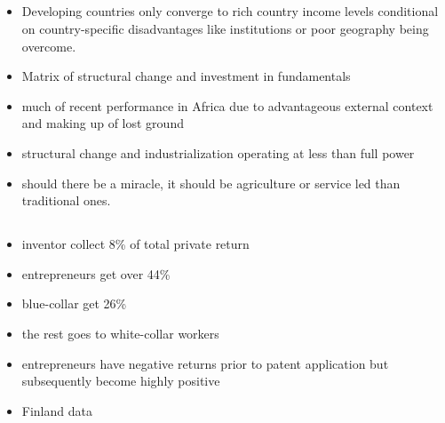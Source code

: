 \documentclass[10pt]{article} %
\begin{document}
    \subsection{\cite{Rodrik2016}}
    \begin{itemize}
        \item Developing countries only converge to rich country income levels conditional on country-specific disadvantages like institutions or poor geography being overcome.
        \item Matrix of structural change and investment in fundamentals
        \item much of recent performance in Africa due to advantageous external context and making up of lost ground
        \item structural change and industrialization operating at less than full power
        \item should there be a miracle, it should be agriculture or service led than traditional ones.
    \end{itemize}

    \subsection{\cite{AghionAkcigitHyytinenToivanen2018}}
    \begin{itemize}
        \item inventor collect 8\% of total private return
        \item entrepreneurs get over 44\%
        \item blue-collar get 26\%
        \item the rest goes to white-collar workers
        \item entrepreneurs have negative returns prior to patent application but subsequently become highly positive
        \item Finland data
    \end{itemize}
\end{document}
